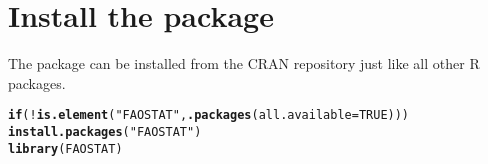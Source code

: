 \documentclass[nojss]{jss}\usepackage[]{graphicx}\usepackage[]{color}
\makeatletter
\newcommand{\hlnum}[1]{\textcolor[rgb]{0.686,0.059,0.569}{#1}}%
\newcommand{\hlstr}[1]{\textcolor[rgb]{0.192,0.494,0.8}{#1}}%
\newcommand{\hlopt}[1]{\textcolor[rgb]{0,0,0}{#1}}%
\newcommand{\hlstd}[1]{\textcolor[rgb]{0.345,0.345,0.345}{#1}}%
\newcommand{\hlkwa}[1]{\textcolor[rgb]{0.161,0.373,0.58}{\textbf{#1}}}%
\newcommand{\hlkwc}[1]{\textcolor[rgb]{0.333,0.667,0.333}{#1}}%
\newcommand{\hlkwd}[1]{\textcolor[rgb]{0.737,0.353,0.396}{\textbf{#1}}}%
\newenvironment{kframe}{%
 \def\at@end@of@kframe{}%
 \ifinner\ifhmode%
  \def\at@end@of@kframe{\end{minipage}}%
  \begin{minipage}{\columnwidth}%
 \fi\fi%
 \def\FrameCommand##1{\hskip\@totalleftmargin \hskip-\fboxsep
 \colorbox{shadecolor}{##1}\hskip-\fboxsep
     \hskip-\linewidth \hskip-\@totalleftmargin \hskip\columnwidth}%
 \MakeFramed {\advance\hsize-\width
   \@totalleftmargin\z@ \linewidth\hsize
   \@setminipage}}%
 {\par\unskip\endMakeFramed%
 \at@end@of@kframe}
\newenvironment{knitrout}{}{} %
\makeatother
\begin{document}
% 
% 

\section{Install the package}

The package can be installed from the CRAN repository just like all
other R packages.

\begin{knitrout}
\color{fgcolor}\begin{kframe}
\begin{alltt}
\hlkwa{if}\hlstd{(}\hlopt{!}\hlkwd{is.element}\hlstd{(}\hlstr{"FAOSTAT"}\hlstd{,} \hlkwd{.packages}\hlstd{(}\hlkwc{all.available} \hlstd{=} \hlnum{TRUE}\hlstd{)))}
   \hlkwd{install.packages}\hlstd{(}\hlstr{"FAOSTAT"}\hlstd{)}
\hlkwd{library}\hlstd{(FAOSTAT)}
\end{alltt}
\end{kframe}
\end{knitrout}
\end{document}
